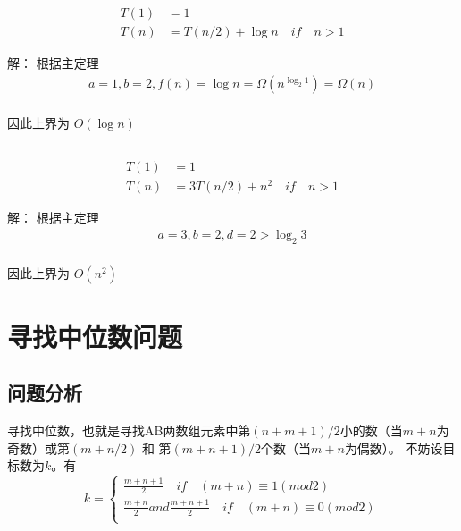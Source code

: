 \subsection{}
\begin{equation}
    \begin{aligned}
        T(1) &=1\\
        T(n) &=T(n/2)+ \log n\quad if\quad n>1
    \end{aligned}
    \nonumber
\end{equation}

解：
根据主定理
\begin{equation}
    \begin{aligned}
        a=1,b=2,f(n)=\log n =\Omega(n^{\log_{2}1})=\Omega(n) \\
    \end{aligned}
    \nonumber
\end{equation}

因此上界为 $O(\log n)$

\subsection{}
\begin{equation}
    \begin{aligned}
        T(1) &=1\\
        T(n) &=3T(n/2)+ n^{2} \quad if\quad n>1
    \end{aligned}
    \nonumber
\end{equation}

解：
根据主定理
\begin{equation}
    \begin{aligned}
        a=3,b=2, d=2 > \log_{2}3 \\
    \end{aligned}
    \nonumber
\end{equation}

因此上界为 $O(n^{2})$

\section{寻找中位数问题}

\subsection*{问题分析}

寻找中位数，也就是寻找AB两数组元素中第$(n+m+1)/2$小的数（当$m+n$为奇数）或第$(m+n/2)$ 和 第$(m+n+1)/2$个数（当$m+n$为偶数）。
不妨设目标数为$k$。有
\begin{equation}
    k = \left\{
    \begin{aligned}
        \frac{m+n+1}{2} \quad if \quad (m+n)\equiv 1 (mod 2) \\
        \frac{m+n}{2} and \frac{m+n+1}{2} \quad if \quad (m+n)\equiv 0 (mod 2) \\
    \end{aligned}
    \right.
    \nonumber
\end{equation}


